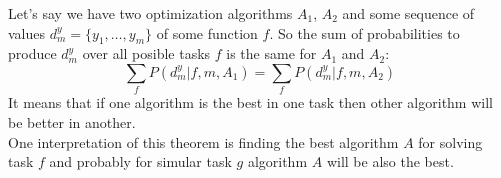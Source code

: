 Let's say we have two optimization algorithms $A_1$, $A_2$ and some sequence of values $d_m^y=\{y_1,\ldots,y_m\}$ of some function $f$. So the sum of probabilities to produce $d_m^y$ over all posible tasks $f$ is the same for $A_1$ and $A_2$:
$$\sum\limits_{f}P(d_m^y|f,m,A_1)=\sum\limits_{f}P(d_m^y|f,m,A_2)$$
It means that if one algorithm is the best in one task then other algorithm will be better in another.\\
One interpretation of this theorem is finding the best algorithm $A$ for solving task $f$ and probably for simular task $g$ algorithm $A$ will be also the best.